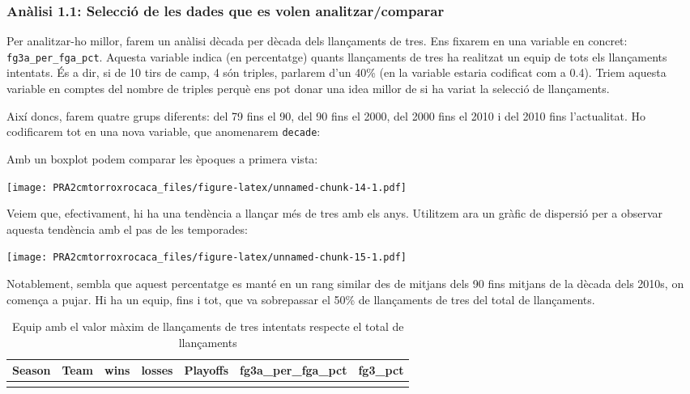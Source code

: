 \documentclass[
]{article}
\begin{document}
\hypertarget{anuxe0lisi-1.1-selecciuxf3-de-les-dades-que-es-volen-analitzarcomparar}{%
\subsubsection{Anàlisi 1.1: Selecció de les dades que es volen
analitzar/comparar}\label{anuxe0lisi-1.1-selecciuxf3-de-les-dades-que-es-volen-analitzarcomparar}}

Per analitzar-ho millor, farem un anàlisi dècada per dècada dels
llançaments de tres. Ens fixarem en una variable en concret:
\texttt{fg3a\_per\_fga\_pct}. Aquesta variable indica (en percentatge)
quants llançaments de tres ha realitzat un equip de tots els llançaments
intentats. És a dir, si de 10 tirs de camp, 4 són triples, parlarem d'un
40\% (en la variable estaria codificat com a 0.4). Triem aquesta
variable en comptes del nombre de triples perquè ens pot donar una idea
millor de si ha variat la selecció de llançaments.

Així doncs, farem quatre grups diferents: del 79 fins el 90, del 90 fins
el 2000, del 2000 fins el 2010 i del 2010 fins l'actualitat. Ho
codificarem tot en una nova variable, que anomenarem \texttt{decade}:

Amb un boxplot podem comparar les èpoques a primera vista:

\texttt{[image: PRA2cmtorroxrocaca\_files/figure-latex/unnamed-chunk-14-1.pdf]}

Veiem que, efectivament, hi ha una tendència a llançar més de tres amb
els anys. Utilitzem ara un gràfic de dispersió per a observar aquesta
tendència amb el pas de les temporades:

\texttt{[image: PRA2cmtorroxrocaca\_files/figure-latex/unnamed-chunk-15-1.pdf]}

Notablement, sembla que aquest percentatge es manté en un rang similar
des de mitjans dels 90 fins mitjans de la dècada dels 2010s, on comença
a pujar. Hi ha un equip, fins i tot, que va sobrepassar el 50\% de
llançaments de tres del total de llançaments.

\begin{table}[!h]

\caption{\label{tab:unnamed-chunk-16}Equip amb el valor màxim de llançaments de tres intentats 
      respecte el total de llançaments}
\centering
\begin{tabular}[t]{llrrlrr}
\toprule
Season & Team & wins & losses & Playoffs & fg3a\_per\_fga\_pct & fg3\_pct\\
\midrule
\cellcolor{gray!6}{2018-19} & \cellcolor{gray!6}{Houston Rockets} & \cellcolor{gray!6}{53} & \cellcolor{gray!6}{29} & \cellcolor{gray!6}{Yes} & \cellcolor{gray!6}{0.519} & \cellcolor{gray!6}{0.356}\\
\bottomrule
\end{tabular}
\end{table}
\end{document}
